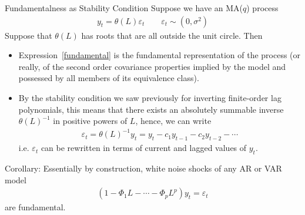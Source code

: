 \documentclass[aspectratio=169, handout]{beamer}
\begin{document}
{\scriptsize
\begin{frame}{Fundamentalness as Stability Condition}
Suppose we have an MA($q$) process
\begin{align}
  y_t = \theta(L)\varepsilon_t
  \qquad
  \varepsilon_t
  \sim (0,\sigma^2)
  \label{fundamental}
\end{align}
Suppose that $\theta(L)$ has \alert{roots} that are
\alert{all outside the unit circle}.
Then
\begin{itemize}
  \item Expression~\ref{fundamental} is the \alert{fundamental}
    representation of the process (or really, of the second order
    covariance properties implied by the model and possessed by all
    members of its equivalence class).

  \pause
  \item By the \alert{stability condition} we saw previously for
    inverting finite-order lag polynomials, this means that there exists
    an absolutely summable inverse $\theta(L)^{-1}$ in positive powers
    of $L$, hence, we can write
    \begin{align*}
      \varepsilon_t = \theta(L)^{-1}y_t
      = y_t - c_1 y_{t-1} - c_2 y_{t-2} - \cdots
    \end{align*}
    i.e. $\varepsilon_t$ can be rewritten in terms of current and lagged
    values of $y_t$.
\end{itemize}
\alert{Corollary}:
Essentially by construction, white noise shocks of any AR or VAR model
\begin{align*}
  (1-\Phi_1L-\cdots-\Phi_pL^p)y_t
  =\varepsilon_t
\end{align*}
are fundamental.
\end{frame}
}
\end{document}
